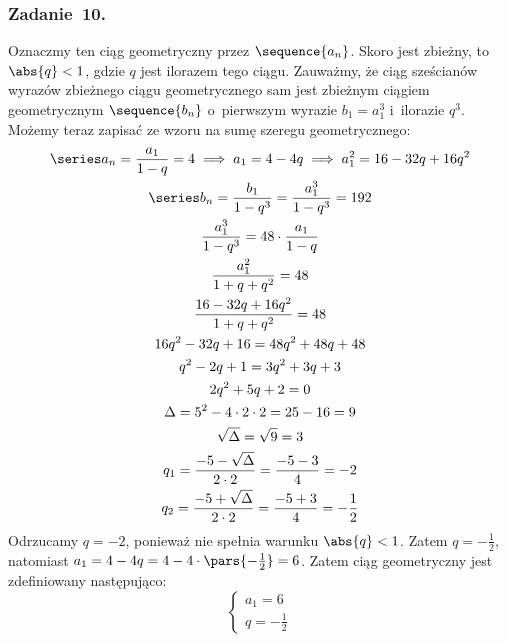 \subsubsection*{Zadanie~10.}
Oznaczmy ten ciąg geometryczny przez \(\sequence{a_n}\). Skoro jest zbieżny, to \(\abs{q} < 1\), gdzie \(q\) jest ilorazem tego ciągu. Zauważmy, że ciąg sześcianów wyrazów zbieżnego ciągu geometrycznego sam jest zbieżnym ciągiem geometrycznym \(\sequence{b_n}\) o~pierwszym wyrazie \(b_1 = a_1^3\) i~ilorazie \(q^3\). Możemy teraz zapisać ze wzoru na sumę szeregu geometrycznego:
\begin{gather*}
    \series a_n = \frac{a_1}{1 - q} = 4 \implies a_1 = 4 - 4q \implies a_1^2 = 16 - 32q + 16q^2\\
    \series b_n = \frac{b_1}{1 - q^3} = \frac{a_1^3}{1 - q^3} = 192\\
    \frac{a_1^3}{1 - q^3} = 48 \cdot \frac{a_1}{1 - q}\\
    \frac{a_1^2}{1 + q + q^2} = 48\\
    \frac{16 - 32q + 16q^2}{1 + q + q^2} = 48\\
    16q^2 - 32q + 16 = 48q^2 + 48q + 48\\
    q^2 - 2q + 1 = 3q^2 + 3q + 3\\
    2q^2 + 5q + 2 = 0\\
    \Delta = 5^2 - 4 \cdot 2 \cdot 2 = 25 - 16 = 9\\
    \sqrt{\Delta} = \sqrt{9} = 3\\
    q_1 = \frac{-5 - \sqrt{\Delta}}{2 \cdot 2} = \frac{-5 - 3}{4} = -2\\
    q_2 = \frac{-5 + \sqrt{\Delta}}{2 \cdot 2} = \frac{-5 + 3}{4} = -\frac{1}{2}
\end{gather*}
Odrzucamy \(q = -2\), ponieważ nie spełnia warunku \(\abs{q} < 1\). Zatem \(q = -\frac{1}{2}\), natomiast \(a_1 = 4 - 4q = 4 - 4 \cdot \pars{-\frac{1}{2}} = 6\). Zatem ciąg geometryczny jest zdefiniowany następująco:
\begin{equation*}
    \begin{cases}
        a_1 = 6\\
        q = -\frac{1}{2}
    \end{cases}
\end{equation*}
